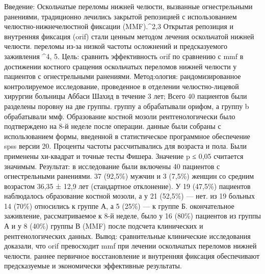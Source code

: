 Введение: Оскольчатые переломы нижней челюсти, вызванные огнестрельными
ранениями, традиционно лечились закрытой репозицией с использованием
челюстно-нижнечелюстной фиксации (MMF).^2,3 Открытая репозиция и внутренняя
фиксация (orif) стали ценным методом лечения оскольчатой нижней
челюсти. переломы из-за низкой частоты осложнений и предсказуемого заживления
^4, 5. Цель: сравнить эффективность orif по сравнению с mmf в достижении
костного сращения оскольчатых переломов нижней челюсти у пациентов с
огнестрельными ранениями. Метод:ология: рандомизированное контролируемое
исследование, проведенное в отделении челюстно-лицевой хирургии больницы Аббаси
Шахид в течение 3 лет; Всего 40 пациентов были разделены поровну на две группы.
группу а обрабатывали орифом, а группу b обрабатывали ммф. Образование костной
мозоли рентгенологически было подтверждено на 8-й неделе после операции. данные
были собраны с использованием формы, введенной в статистическое программное
обеспечение spss версии 20. Проценты частоты рассчитывались для возраста и пола.
Были применены хи-квадрат и точные тесты Фишера. Значение p ≤ 0,05 считается
значимым. Результат: в исследование были включены 40 пациентов с огнестрельными
ранениями. 37 (92,5\%) мужчин и 3 (7,5\%) женщин со средним возрастом 36,35 ±
12,9 лет (стандартное отклонение). У 19 (47,5\%) пациентов наблюдалось
образование костной мозоли, а у 21 (52,5\%) — нет. из 19 больных 14 (70\%)
относились к группе А, а 5 (25\%) — к группе Б. окончательное заживление,
рассматриваемое к 8-й неделе, было у 16 (80\%) пациентов из группы А и у 8
(40\%) группы В (MMF) после подсчета клинических и рентгенологических данных.
Вывод: сравнительные клинические исследования доказали, что orif превосходит mmf
при лечении оскольчатых переломов нижней челюсти. раннее первичное
восстановление и внутренняя фиксация обеспечивают предсказуемые и экономически
эффективные результаты.\cite{31806484}

